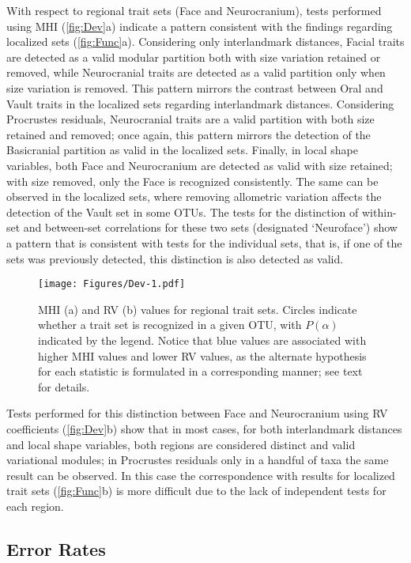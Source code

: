 \documentclass[12pt,twoside]{report}
\begin{document}
With respect to regional trait sets (Face and Neurocranium), tests
performed using MHI (\autoref{fig:Dev}a) indicate a pattern consistent
with the findings regarding localized sets (\autoref{fig:Func}a).
Considering only interlandmark distances, Facial traits are detected as
a valid modular partition both with size variation retained or removed,
while Neurocranial traits are detected as a valid partition only when
size variation is removed. This pattern mirrors the contrast between
Oral and Vault traits in the localized sets regarding interlandmark
distances. Considering Procrustes residuals, Neurocranial traits are a
valid partition with both size retained and removed; once again, this
pattern mirrors the detection of the Basicranial partition as valid in
the localized sets. Finally, in local shape variables, both Face and
Neurocranium are detected as valid with size retained; with size
removed, only the Face is recognized consistently. The same can be
observed in the localized sets, where removing allometric variation
affects the detection of the Vault set in some OTUs. The tests for the
distinction of within-set and between-set correlations for these two
sets (designated `Neuroface') show a pattern that is consistent with
tests for the individual sets, that is, if one of the sets was
previously detected, this distinction is also detected as valid.

\begin{figure}[htbp]
\centering
\texttt{[image: Figures/Dev-1.pdf]}
\caption{MHI (a) and RV (b) values for regional trait sets. Circles
indicate whether a trait set is recognized in a given OTU, with
$P(\alpha)$ indicated by the legend. Notice that blue values are
associated with higher MHI values and lower RV values, as the alternate
hypothesis for each statistic is formulated in a corresponding manner;
see text for details. \label{fig:Dev}}
\end{figure}

Tests performed for this distinction between Face and Neurocranium using
RV coefficients (\autoref{fig:Dev}b) show that in most cases, for both
interlandmark distances and local shape variables, both regions are
considered distinct and valid variational modules; in Procrustes
residuals only in a handful of taxa the same result can be observed. In
this case the correspondence with results for localized trait sets
(\autoref{fig:Func}b) is more difficult due to the lack of independent
tests for each region.

\subsection{Error Rates}\label{error-rates}
\end{document}
